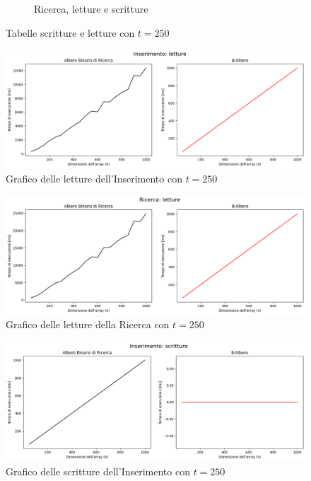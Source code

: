\begin{figure}[H]
\begin{subfigure}[b]{0.49\textwidth}
        \caption{Ricerca, letture e scritture}
        \label{fig:tablesearchwr250}
    \end{subfigure}
    \caption{Tabelle scritture e letture con $t=250$}
    \label{fig:tablewr250}
\end{figure}

\begin{figure}[H]
    \centering
    \includegraphics[width=\textwidth]{side-graphs/insert-r-t250.png}
    \caption{Grafico delle letture dell'Inserimento con $t=250$}
    \label{fig:sidegraphinsertread250}
\end{figure}
    
\begin{figure}[H]
    \centering
    \includegraphics[width=\textwidth]{side-graphs/search-r-t250.png}
    \caption{Grafico delle letture della Ricerca con $t=250$}
    \label{fig:sidegraphsearchread250}
\end{figure}

\begin{figure}[H]
    \centering
    \includegraphics[width=\textwidth]{side-graphs/insert-w-t250.png}
    \caption{Grafico delle scritture dell'Inserimento con $t=250$}
    \label{fig:sidegraphinsertwrite250}
\end{figure}
    
